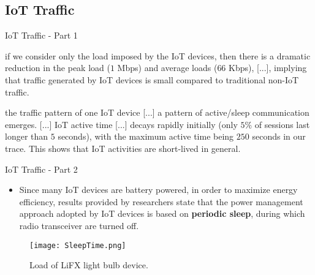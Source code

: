 \documentclass[13.5pt]{beamer}
\begin{document}
\subsection{IoT Traffic}
\begin{frame}{IoT Traffic - Part 1}

\begin{quoting}[font=itshape, begintext={``}, endtext={''\\\textbf{\citet{ITPAReport}}}]
\justifying
[...] if we consider only the load imposed by the IoT devices, then there is a dramatic reduction in the peak load ($1$ Mbps) and average loads ($66$ Kbps), [...], implying that traffic generated by IoT devices is small compared to traditional non-IoT traffic. 
\end{quoting}

\begin{quoting}[font=itshape, begintext={``}, endtext={''\\\textbf{\citet{ITPAReport}}}]
\justifying
the traffic pattern of one IoT device [...] a pattern of active/sleep communication emerges. [...] IoT active time [...] decays rapidly initially (only $5\%$ of sessions last longer than $5$ seconds), with the maximum active time being $250$ seconds in our trace. This shows that IoT activities are short-lived in general. 
\end{quoting}

\end{frame} 
\begin{frame}{IoT Traffic - Part 2}

\begin{itemize}
\justifying
\item Since many IoT devices are battery powered, in order to maximize energy efficiency, results provided by researchers state that the power management approach adopted by IoT devices is based on \textbf{periodic sleep}, during which radio transceiver are turned off.
\end{itemize}

\begin{figure}
  \texttt{[image: SleepTime.png]}
  \caption{Load of LiFX light bulb device.}
  \label{fig1}
\end{figure}

\end{frame} 
\end{document}
